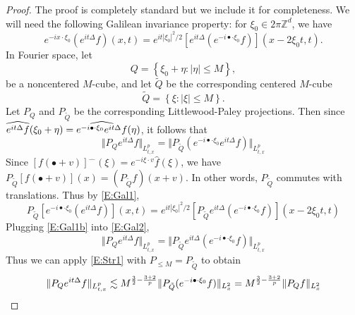 \documentclass[12pt,letterpaper,leqno]{amsart}
\theoremstyle{plain}
\numberwithin{equation}{section}
\numberwithin{theorem}{section}
\numberwithin{proposition}{section}
\numberwithin{lemma}{section}
\numberwithin{corollary}{section}
\begin{document}
\begin{proof}
The proof is completely standard but we include it for completeness. We will
need the following Galilean invariance property: for $\xi _{0}\in 2\pi 
\mathbb{Z}^{d}$, we have 
\begin{equation}
e^{-ix\cdot \xi _{0}}(e^{it\Delta }f)(x,t)=e^{it|\xi
_{0}|^{2}/2}[e^{it\Delta }(e^{-i\bullet \cdot \xi _{0}}f)](x-2\xi _{0}t,t).
\label{E:Gal1}
\end{equation}%
In Fourier space, let 
\begin{equation*}
Q=\left\{ \xi _{0}+\eta :\left\vert \eta \right\vert \leqslant M\right\} ,
\end{equation*}%
be a noncentered $M$-cube, and let $\tilde{Q}$ be the corresponding centered 
$M$-cube 
\begin{equation*}
\tilde{Q}=\left\{ \xi :\left\vert \xi \right\vert \leqslant M\right\} .
\end{equation*}%
Let $P_{Q}$ and $P_{\tilde{Q}}$ be the corresponding Littlewood-Paley
projections. Then since $\widehat{e^{it\Delta }f}(\xi _{0}+\eta )=\widehat{%
e^{-i\bullet \cdot \xi _{0}}e^{it\Delta }f}(\eta )$, it follows that 
\begin{equation}
\Vert P_{Q}e^{it\Delta }f\Vert _{L_{t,x}^{p}}=\Vert P_{\tilde{Q}%
}(e^{-i\bullet \cdot \xi _{0}}e^{it\Delta }f)\Vert _{L_{t,x}^{p}}
\label{E:Gal2}
\end{equation}%
Since $[f(\bullet +v)]^{\widehat{\quad }}(\xi )=e^{-i\xi \cdot v}\hat{f}(\xi
)$, we have $P_{\tilde{Q}}[f(\bullet +v)](x)=(P_{\tilde{Q}}f)(x+v)$. In
other words, $P_{\tilde{Q}}$ commutes with translations. Thus by %
\eqref{E:Gal1}, 
\begin{equation}
P_{\tilde{Q}}[e^{-i\bullet \cdot \xi _{0}}(e^{it\Delta }f)](x,t)=e^{it|\xi
_{0}|^{2}/2}[P_{\tilde{Q}}e^{it\Delta }(e^{-i\bullet \cdot \xi
_{0}}f)](x-2\xi _{0}t,t)  \label{E:Gal1b}
\end{equation}%
Plugging \eqref{E:Gal1b} into \eqref{E:Gal2}, 
\begin{equation*}
\Vert P_{Q}e^{it\Delta }f\Vert _{L_{t,x}^{p}}=\Vert P_{\tilde{Q}}e^{it\Delta
}(e^{-i\bullet \cdot \xi _{0}}f)\Vert _{L_{t,x}^{p}}
\end{equation*}%
Thus we can apply \eqref{E:Str1} with $P_{\leq M}=P_{\tilde{Q}}$ to obtain 
\begin{equation*}
\Vert P_{Q}e^{it\Delta }f\Vert _{L_{t,x}^{p}}\lesssim M^{\frac{3}{2}-\frac{%
3+2}{p}}\Vert P_{\tilde{Q}}(e^{-i\bullet \cdot \xi _{0}}f)\Vert
_{L_{x}^{2}}=M^{\frac{3}{2}-\frac{3+2}{p}}\Vert P_{Q}f\Vert _{L_{x}^{2}}
\end{equation*}
\end{proof}
\end{document}
